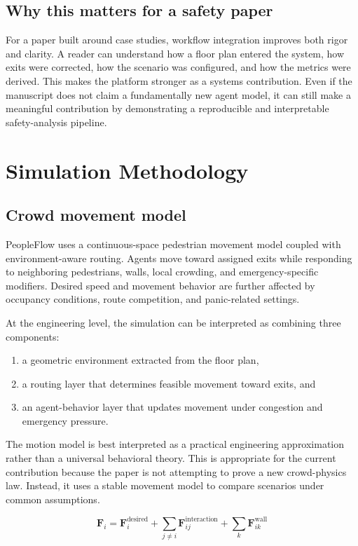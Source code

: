 \documentclass[conference]{IEEEtran}
\begin{document}
\subsection{Why this matters for a safety paper}

For a paper built around case studies, workflow integration improves both rigor and clarity. A reader can understand how a floor plan entered the system, how exits were corrected, how the scenario was configured, and how the metrics were derived. This makes the platform stronger as a systems contribution. Even if the manuscript does not claim a fundamentally new agent model, it can still make a meaningful contribution by demonstrating a reproducible and interpretable safety-analysis pipeline.

\section{Simulation Methodology}
\subsection{Crowd movement model}
PeopleFlow uses a continuous-space pedestrian movement model coupled with environment-aware routing. Agents move toward assigned exits while responding to neighboring pedestrians, walls, local crowding, and emergency-specific modifiers. Desired speed and movement behavior are further affected by occupancy conditions, route competition, and panic-related settings.

At the engineering level, the simulation can be interpreted as combining three components:
\begin{enumerate}
    \item a geometric environment extracted from the floor plan,
    \item a routing layer that determines feasible movement toward exits, and
    \item an agent-behavior layer that updates movement under congestion and emergency pressure.
\end{enumerate}

The motion model is best interpreted as a practical engineering approximation rather than a universal behavioral theory. This is appropriate for the current contribution because the paper is not attempting to prove a new crowd-physics law. Instead, it uses a stable movement model to compare scenarios under common assumptions.

\begin{equation}
\mathbf{F}_i = \mathbf{F}_i^{\text{desired}} + \sum_{j \neq i}\mathbf{F}_{ij}^{\text{interaction}} + \sum_k \mathbf{F}_{ik}^{\text{wall}}
\label{eq:force}
\end{equation}
\end{document}
